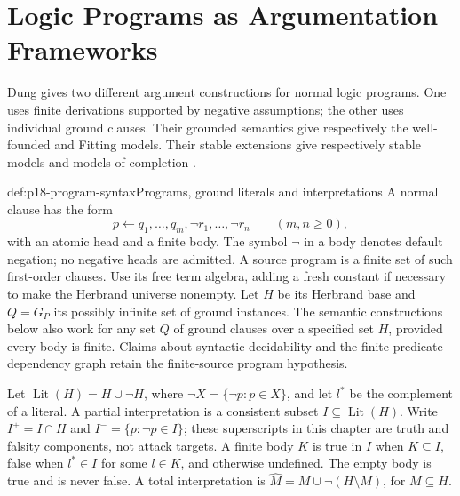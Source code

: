 \chapter{Logic Programs as Argumentation Frameworks}
\label{sec:p18-logic-program-argumentation}

Dung gives two different argument constructions for normal logic
programs. One uses finite derivations supported by negative assumptions;
the other uses individual ground clauses. Their grounded semantics
give respectively the well-founded and Fitting models. Their stable
extensions give respectively stable models and models of completion
\cite[sec.~4.3 and appendices~A--C]{Dung1995}.

\begin{hbdefinition}{def:p18-program-syntax}{Programs, ground literals and interpretations}
A normal clause has the form
\[
 p\leftarrow q_1,\ldots,q_m,\neg r_1,\ldots,\neg r_n
                 \qquad(m,n\geq0),
\]
with an atomic head and a finite body. The symbol \(\neg\) in
a body denotes default negation; no negative heads are admitted.
A source program is a finite set of such first-order clauses.
Use its free term algebra, adding a fresh constant if necessary
to make the Herbrand universe nonempty. Let \(H\) be its
Herbrand base and \(Q=G_P\) its possibly infinite set of ground
instances. The semantic constructions below also work for any
set \(Q\) of ground clauses over a specified set \(H\), provided
every body is finite. Claims about syntactic decidability and
the finite predicate dependency graph retain the finite-source
program hypothesis.

Let \(\operatorname{Lit}(H)=H\cup\neg H\), where
\(\neg X=\{\neg p:p\in X\}\), and let \(l^*\) be the
complement of a literal. A partial interpretation is a
consistent subset \(I\subseteq\operatorname{Lit}(H)\).
Write \(I^+=I\cap H\) and
\(I^-=\{p:\neg p\in I\}\); these superscripts in this
chapter are truth and falsity components, not attack targets.
A finite body \(K\) is true in \(I\) when \(K\subseteq I\),
false when \(l^*\in I\) for some \(l\in K\), and otherwise
undefined. The empty body is true and is never false.
A total interpretation is
\(\widehat M=M\cup\neg(H\setminus M)\), for \(M\subseteq H\).
\end{hbdefinition}

